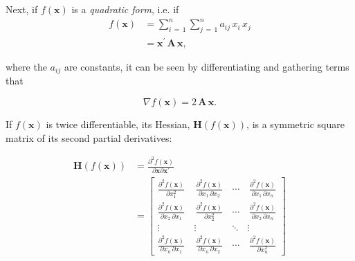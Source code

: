\documentclass[graybox,envcountchap,sectrefs]{svmono}\usepackage[]{graphicx}\usepackage[]{xcolor}
\begin{document}
\begin{appendices}
Next, if $f\left(\mathrm{\mathbf{x}}\right)$ is a \emph{quadratic
form}, i.e. if
\begin{align}
f\left(\mathrm{\mathbf{x}}\right) & =\sum_{i\,=\,1}^{n}\sum_{j\,=\,1}^{n}a_{ij}\,x_{i}\,x_{j}\nonumber \\
 & =\mathrm{\mathbf{x}}^{\prime}\,\mathbf{A}\,\mathrm{\mathbf{x}},\label{eq:fx_quadratic_form}
\end{align}

where the $a_{ij}$ are constants, it can be seen by differentiating
and gathering terms that

\begin{equation}
\nabla f\left(\mathrm{\mathbf{x}}\right)=2\,\mathbf{A}\,\mathrm{\mathbf{x}}.\label{eq:GradientQuadraticForm}
\end{equation}

If $f\left(\mathrm{\mathbf{x}}\right)$ is twice differentiable, its
Hessian, $\mathrm{\mathbf{H}}\left(f\left(\mathrm{\mathbf{x}}\right)\right)$,
is a symmetric square matrix of its second partial derivatives:

\begin{align}
\mathrm{\mathbf{H}}\left(f\left(\mathrm{\mathbf{x}}\right)\right) & =\frac{\partial^{2}f\left(\mathrm{\mathbf{x}}\right)}{\partial\mathrm{\mathbf{x}}\partial\mathrm{\mathbf{x}}^{\prime}}\nonumber \\
 & =\left[\begin{array}{cccc}
\frac{\partial^{2}f\left(\mathrm{\mathbf{x}}\right)}{\partial x_{1}^{2}}\, & \,\frac{\partial^{2}f\left(\mathrm{\mathbf{x}}\right)}{\partial x_{1}\,\partial x_{2}}\, & \cdots & \,\frac{\partial^{2}f\left(\mathrm{\mathbf{x}}\right)}{\partial x_{1}\,\partial x_{n}}\\
\frac{\partial^{2}f\left(\mathrm{\mathbf{x}}\right)}{\partial x_{2}\,\partial x_{1}}\, & \,\frac{\partial^{2}f\left(\mathrm{\mathbf{x}}\right)}{\partial x_{2}^{2}}\, & \cdots & \,\frac{\partial^{2}f\left(\mathrm{\mathbf{x}}\right)}{\partial x_{2}\,\partial x_{n}}\\
\vdots & \vdots & \ddots & \vdots\\
\frac{\partial^{2}f\left(\mathrm{\mathbf{x}}\right)}{\partial x_{n}\,\partial x_{1}}\, & \,\frac{\partial^{2}f\left(\mathrm{\mathbf{x}}\right)}{\partial x_{n}\,\partial x_{2}}\, & \cdots & \,\frac{\partial^{2}f\left(\mathrm{\mathbf{x}}\right)}{\partial x_{n}^{2}}
\end{array}\right]\label{eq:Hessian}
\end{align}


\end{appendices}
\end{document}
